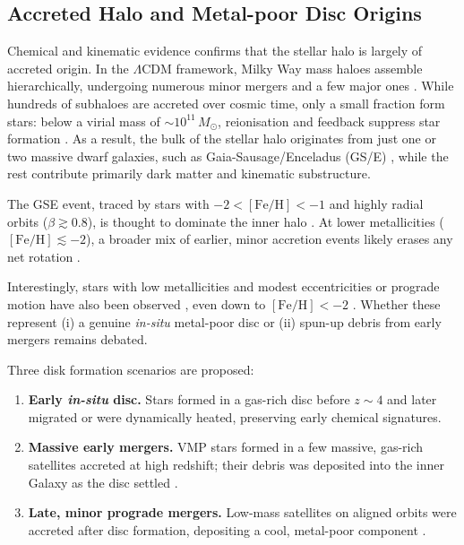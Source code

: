 \documentclass[a4paper,12pt]{article}
\begin{document}
\subsection{Accreted Halo and Metal-poor Disc Origins}
\label{subsec:halo_disc_origins}

Chemical and kinematic evidence confirms that the stellar halo is largely of accreted origin. 
In the $\Lambda$CDM framework, Milky Way mass haloes assemble hierarchically, undergoing 
numerous minor mergers and a few major ones \citep{Springel2008}. 
While hundreds of subhaloes are accreted over cosmic time, only a small fraction form stars: 
below a virial mass of $\sim10^{11}\,M_\odot$, reionisation and feedback suppress star formation 
\citep{Purcell2007,BullockBoylanKolchin2017}. As a result, the bulk of the stellar halo originates 
from just one or two massive dwarf galaxies, such as Gaia-Sausage/Enceladus (GS/E) \citep{Belokurov2020}, while the rest 
contribute primarily dark matter and kinematic substructure.

The GSE event, traced by stars with $-2 < [\mathrm{Fe/H}] < -1$ and highly radial orbits 
($\beta \gtrsim 0.8$), is thought to dominate the inner halo \citep{Belokurov2018,Helmi2018}. 
At lower metallicities ($[\mathrm{Fe/H}] \lesssim -2$), a broader mix of earlier, minor accretion 
events likely erases any net rotation \citep{Lancaster2019,Bird2021}.

Interestingly, stars with low metallicities and modest eccentricities or prograde motion 
have also been observed \citep{Norris1985,Chiba2000,Carollo2019,An2020}, even down to 
$[\mathrm{Fe/H}] < -2$ \citep{Sestito2019,Venn2020,Cordoni2020,Mardini2022}. 
Whether these represent (i) a genuine \textit{in-situ} metal-poor disc or 
(ii) spun-up debris from early mergers remains debated.

Three disk formation scenarios are proposed:
\begin{enumerate}
    \item \textbf{Early {\it in-situ} disc.}  
          Stars formed in a gas-rich disc before $z\sim4$ and later migrated or were dynamically heated, 
          preserving early chemical signatures.
    \item \textbf{Massive early mergers.}  
          VMP stars formed in a few massive, gas-rich satellites accreted at high redshift; 
          their debris was deposited into the inner Galaxy as the disc settled \citep[e.g.][]{Sestito2020}.
    \item \textbf{Late, minor prograde mergers.}  
          Low-mass satellites on aligned orbits were accreted after disc formation, 
          depositing a cool, metal-poor component \citep{Santistevan2021}.
\end{enumerate}
\end{document}
